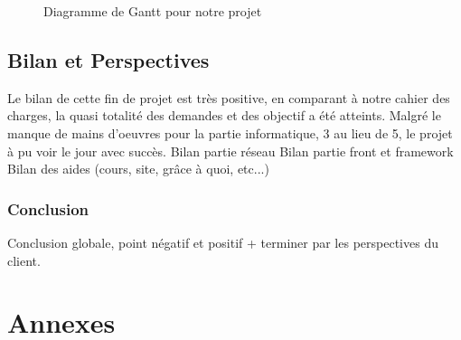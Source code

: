 \documentclass{report}
\begin{document}
\begin{figure}[b]
    \centering
    \caption{Diagramme de Gantt pour notre projet}
    \label{Gantt}
\end{figure}
\chapter{Bilan et Perspectives} %
Le bilan de cette fin de projet est très positive, en comparant à notre cahier des charges, la quasi totalité des demandes et des objectif a été atteints. Malgré le manque de mains d'oeuvres pour la partie informatique, 3 au lieu de 5, le projet à pu voir le jour avec succès.
Bilan partie réseau
Bilan partie front et framework
Bilan des aides (cours, site, grâce à quoi, etc...)

\vspace{1cm}
\section*{Conclusion}

Conclusion globale, point négatif et positif + terminer par les perspectives du client.

\part*{Annexes}
\end{document}
